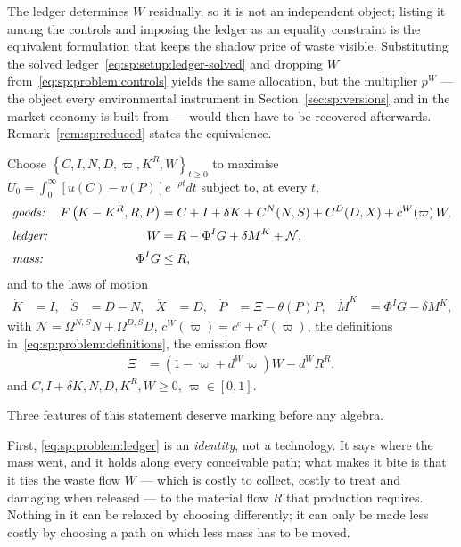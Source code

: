  The ledger determines $W$ residually, so it is not an
independent object; listing it among the controls and imposing the ledger as an equality constraint
is the equivalent formulation that keeps the shadow price of waste visible. Substituting the solved
ledger~\eqref{eq:sp:setup:ledger-solved} and dropping $W$ from~\eqref{eq:sp:problem:controls} yields
the same allocation, but the multiplier $p^W$ --- the object every environmental instrument in
Section~\ref{sec:sp:versions} and in the market economy is built from --- would then have to be
recovered afterwards. Remark~\ref{rem:sp:reduced} states the equivalence.

\begin{problem}\label{prob:sp:planner}
Choose $\left\{C,I,N,D,\varpi,K^R,W\right\}_{t\ge0}$ to maximise
$U_0=\int_0^\infty\left[u(C)-v(P)\right]e^{-\rho t}dt$ subject to, at every $t$,
\begin{align}
&\text{\emph{goods:}}
&
F\left(K-K^R,R,P\right) &= C+I+\delta K+C^N(N,S)+C^D(D,X)+c^W\!\left(\varpi\right)W,
\label{eq:sp:problem:goods}
\\[0.2em]
&\text{\emph{ledger:}}
&
W &= R-\Phi^I G+\delta M^K+\mathcal N,
\label{eq:sp:problem:ledger}
\\[0.2em]
&\text{\emph{mass:}}
&
\Phi^I G &\le R,
\label{eq:sp:problem:mass}
\end{align}
and to the laws of motion
\begin{align}
\dot K &= I,
&
\dot S &= D-N,
&
\dot X &= D,
&
\dot P &= \Xi-\theta(P)P,
&
\dot M^K &= \Phi^I G-\delta M^K,
\label{eq:sp:problem:states-motion}
\end{align}
with $\mathcal N=\Omega^{N,S}N+\Omega^{D,S}D$, $c^W(\varpi)=c^c+c^T(\varpi)$, the definitions
in~\eqref{eq:sp:problem:definitions}, the emission flow
\begin{align}
\Xi &= \left(1-\varpi+d^W\varpi\right)W-d^WR^R,
\label{eq:sp:problem:Xi}
\end{align}
and $C,I+\delta K,N,D,K^R,W\ge0$, $\varpi\in\left[0,1\right]$.
\end{problem}

Three features of this statement deserve marking before any algebra.

First, \eqref{eq:sp:problem:ledger} is an \emph{identity}, not a technology. It says where the mass
went, and it holds along every conceivable path; what makes it bite is that it ties the waste flow
$W$ --- which is costly to collect, costly to treat and damaging when released --- to the material
flow $R$ that production requires. Nothing in it can be relaxed by choosing differently; it can only
be made less costly by choosing a path on which less mass has to be moved.

